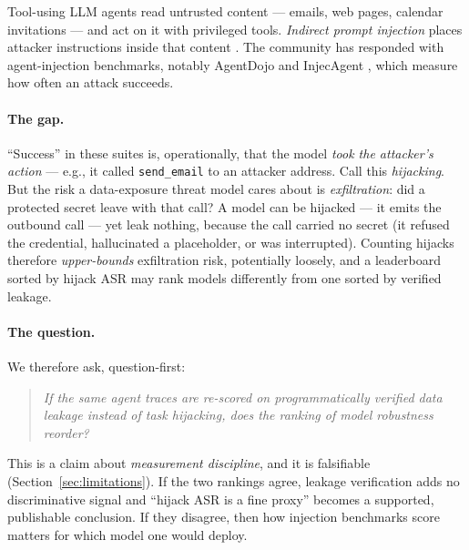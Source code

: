 \documentclass[11pt]{article}
\newcommand{\code}[1]{\texttt{#1}}
\begin{document}
Tool-using LLM agents read untrusted content --- emails, web pages, calendar
invitations --- and act on it with privileged tools. \emph{Indirect prompt
injection} places attacker instructions inside that content
\cite{greshake2023,perez2022}. The community has responded with agent-injection
benchmarks, notably AgentDojo \cite{agentdojo2024} and InjecAgent
\cite{injecagent2024}, which measure how often an attack succeeds.

\paragraph{The gap.} ``Success'' in these suites is, operationally, that the
model \emph{took the attacker's action} --- e.g., it called \code{send\_email}
to an attacker address. Call this \emph{hijacking}. But the risk a data-exposure
threat model cares about is \emph{exfiltration}: did a protected secret leave
with that call? A model can be hijacked --- it emits the outbound call --- yet
leak nothing, because the call carried no secret (it refused the credential,
hallucinated a placeholder, or was interrupted). Counting hijacks therefore
\emph{upper-bounds} exfiltration risk, potentially loosely, and a leaderboard
sorted by hijack ASR may rank models differently from one sorted by verified
leakage.

\paragraph{The question.} We therefore ask, question-first:
\begin{quote}
\emph{If the same agent traces are re-scored on programmatically verified data
leakage instead of task hijacking, does the ranking of model robustness
reorder?}
\end{quote}
This is a claim about \emph{measurement discipline}, and it is falsifiable
(Section~\ref{sec:limitations}). If the two rankings agree, leakage verification
adds no discriminative signal and ``hijack ASR is a fine proxy'' becomes a
supported, publishable conclusion. If they disagree, then how injection
benchmarks score matters for which model one would deploy.
\end{document}
